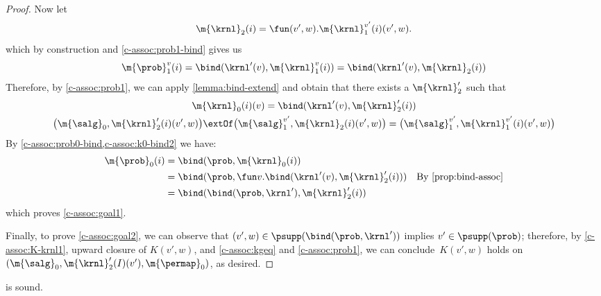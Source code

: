 \begin{proof}
  Now let
  \[
    \m{\krnl}_2(i) = \fun (v', w). \m{\krnl}_1^{v'}(i)(v', w).
  \]
  which by construction and \cref{c-assoc:prob1-bind} gives us
  \[
    \m{\prob}_1^v(i)
    = \bind(\krnl'(v), \m{\krnl}_1^v(i))
    = \bind(\krnl'(v), \m{\krnl}_2(i))
  \]
  Therefore, by \cref{c-assoc:prob1}, we can apply \cref{lemma:bind-extend}
  and obtain that there exists a $\m{\krnl}_2'$ such that
  \begin{gather}
    \m{\krnl}_0(i)(v) = \bind(\krnl'(v), \m{\krnl}_2'(i))
    \label{c-assoc:k0-bind2}
    \\
    \bigl(\m{\salg}_0, \m{\krnl}_2'(i)(v',w)\bigr)
    \extOf
    \bigl(\m{\salg}_1^{v'}, \m{\krnl}_2(i)(v',w)\bigr)
    =
    \bigl(\m{\salg}_1^{v'},\m{\krnl}_1^{v'}(i)(v',w)\bigr)
    \label{c-assoc:kgeq}
  \end{gather}
  By \cref{c-assoc:prob0-bind,c-assoc:k0-bind2}
  we have:
  \begin{align*}
    \m{\prob}_0(i)
    &= \bind(\prob, \m{\krnl}_0(i)) \\
    &= \bind(\prob, \fun v.\bind(\krnl'(v), \m{\krnl}_2'(i)))
      &\text{By \eqref{prop:bind-assoc}}\\
    &= \bind(\bind(\prob, \krnl'), \m{\krnl}_2'(i))
  \end{align*}
  which proves \cref{c-assoc:goal1}.

  Finally, to prove \cref{c-assoc:goal2}, we can observe that
  $(v',w) \in \psupp(\bind(\prob,\krnl'))$ implies $v'\in \psupp(\prob)$;
  therefore, by \eqref{c-assoc:K-krnl1}, upward closure of $K(v',w)$, and
  \eqref{c-assoc:kgeq} and \eqref{c-assoc:prob1},
  we can conclude~$K(v',w)$ holds on
  $(\m{\salg}_0 , \m{\krnl}_2'(I) (v'), \m{\permap}_0)$,
  as desired.
\end{proof} \begin{lemma}
\label{proof:c-unassoc}
   is sound.
\end{lemma}

